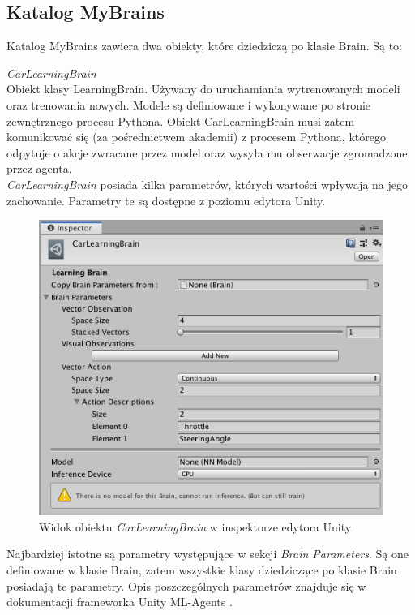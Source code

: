 \subsection{Katalog MyBrains}
Katalog MyBrains zawiera dwa obiekty, które dziedziczą po klasie Brain. Są to:
\begin{enumerate*}
\item \textit{CarLearningBrain} \\
Obiekt klasy LearningBrain. Używany do uruchamiania wytrenowanych modeli oraz trenowania nowych. Modele są definiowane i wykonywane po stronie zewnętrznego procesu Pythona. Obiekt CarLearningBrain musi zatem komunikować się (za pośrednictwem akademii) z procesem Pythona, którego odpytuje o akcje zwracane przez model oraz wysyła mu obserwacje zgromadzone przez agenta. \\
\textit{CarLearningBrain} posiada kilka parametrów, których wartości wpływają na jego zachowanie. Parametry te są dostępne z poziomu edytora Unity.

\vspace{0.5cm}
\begin{figure}[H]
\centering
\includegraphics[width=13cm]{resources/figures/learningBrain.png}
\caption{Widok obiektu \textit{CarLearningBrain} w inspektorze edytora Unity}
\label{CarLearningBrainView}
\end{figure}

Najbardziej istotne są parametry występujące w sekcji \textit{Brain Parameters}. Są one definiowane w klasie Brain, zatem wszystkie klasy dziedziczące po klasie Brain posiadają te parametry. Opis poszczególnych parametrów znajduje się w dokumentacji frameworka Unity ML-Agents \cite{unityMla:brainDescription}.


\end{enumerate*}
